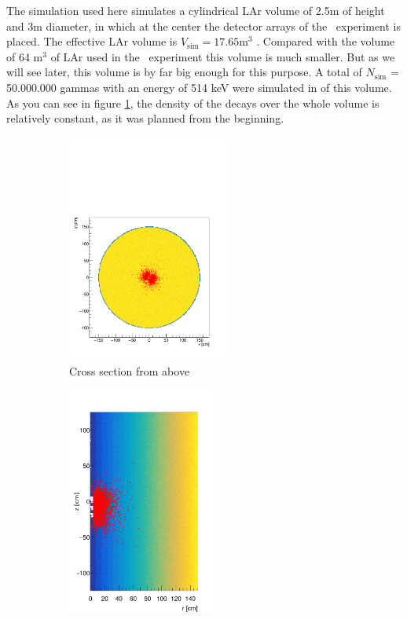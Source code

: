 \documentclass[encoding=utf8,british]{tumphthesis}
\begin{document}
The simulation used here simulates a cylindrical LAr volume of 2.5m of height and 3m diameter, in which at the center the detector arrays of the \gerda\ experiment is placed.
The effective LAr volume is $V_{\mathrm{sim}} = 17.65 \mathrm{m}^3$ .
Compared with the volume of 64 m\(^3\) of LAr used in the \gerda\ experiment this volume is much smaller.
But as we will see later, this volume is by far big enough for this purpose.
A total of $N_{\mathrm{sim}}$ = 50.000.000 gammas with an energy of 514 keV were simulated in of this volume. 
As you can see in figure \ref{fig:CrossSecAb}, the density of the decays over the whole volume is relatively constant, as it was planned from the beginning.
\\

\begin{figure}[t!]
	\centering
	\begin{subfigure}{.5\textwidth}
		\centering
		\includegraphics[height=75mm]{./Bilder/MC-Querschnitt-BEGes.pdf}
		\caption{Cross section from above}
		\label{fig:CrossSecAb}
	\end{subfigure}\hfill%
	\begin{subfigure}{.5\textwidth}
		\centering
		\includegraphics[height=75mm]{./Bilder/MC-Radius-BEGes.png}

\end{subfigure}
\end{figure}
\end{document}
